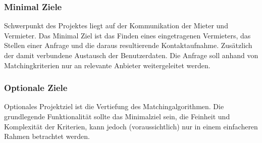 \subsubsection{Minimal Ziele}
Schwerpunkt des Projektes liegt auf der Kommunikation der Mieter und Vermieter. Das Minimal Ziel ist das Finden eines eingetragenen Vermieters, das Stellen einer Anfrage und die daraus resultierende Kontaktaufnahme. Zusätzlich der damit verbundene Austausch der Benutzerdaten. Die Anfrage soll anhand von Matchingkriterien nur an relevante Anbieter weitergeleitet werden.

\subsubsection{Optionale Ziele}
Optionales Projektziel ist die Vertiefung des Matchingalgorithmen. Die grundlegende Funktionalität sollte das Minimalziel sein, die Feinheit und Komplexität der Kriterien, kann jedoch (voraussichtlich) nur in einem einfacheren Rahmen betrachtet werden.



